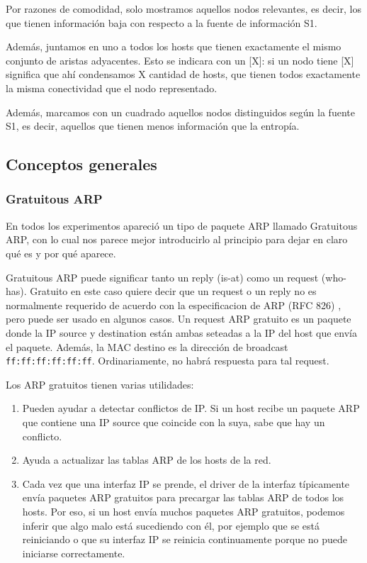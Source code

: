 Por razones de comodidad, solo mostramos aquellos nodos relevantes, es decir, los que tienen información baja con respecto a la fuente de información S1.

Además, juntamos en uno a todos los hosts que tienen exactamente el mismo conjunto de aristas adyacentes. Esto se indicara con un [X]: si un nodo tiene [X] significa que ahí condensamos X cantidad de hosts, que tienen todos exactamente la misma conectividad que el nodo representado. 

Además, marcamos con un cuadrado aquellos nodos distinguidos según la fuente S1, es decir, aquellos que tienen menos información que la entropía.


\subsection{Conceptos generales}

\subsubsection{Gratuitous ARP}

En todos los experimentos apareció un tipo de paquete ARP llamado Gratuitous ARP, con lo cual nos parece mejor introducirlo al principio para dejar en claro qu\'e es y por qu\'e aparece.

Gratuitous ARP puede significar tanto un reply (is-at) como un request (who-has). Gratuito en este caso quiere decir que un request o un reply no es normalmente requerido de acuerdo con la especificacion de ARP (RFC 826) \cite{arp}, pero puede ser usado en algunos casos.
Un request ARP gratuito es un paquete donde la IP source y destination están ambas seteadas a la IP del host que envía el paquete. Además, la MAC destino es la dirección de broadcast \texttt{ff:ff:ff:ff:ff:ff}. Ordinariamente, no habrá respuesta para tal request.

Los ARP gratuitos tienen varias utilidades:

\begin{enumerate}
  \item Pueden ayudar a detectar conflictos de IP. Si un host recibe un paquete ARP que contiene una IP source que coincide con la suya, sabe que hay un conflicto.
  \item Ayuda a actualizar las tablas ARP de los hosts de la red.
  \item Cada vez que una interfaz IP se prende, el driver de la interfaz típicamente envía paquetes ARP gratuitos para precargar las tablas ARP de todos los hosts. Por eso, si un host envía muchos paquetes ARP gratuitos, podemos inferir que algo malo está sucediendo con \'el, por ejemplo que se está reiniciando o que su interfaz IP se reinicia continuamente porque no puede iniciarse correctamente.
\end{enumerate}


